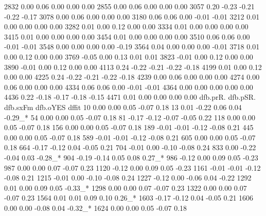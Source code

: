 \begin{Schunk}
\begin{Soutput}
2832  0.00   0.06     0.00     0.00     0.00   
2855  0.00   0.06     0.00     0.00     0.00   
3057  0.20  -0.23    -0.21    -0.22    -0.17   
3078  0.00   0.06     0.00     0.00     0.00   
3180  0.06   0.06     0.00    -0.01    -0.01   
3212  0.01   0.00     0.00     0.00     0.00   
3282  0.01   0.00     0.12     0.00     0.00   
3334  0.01   0.00     0.00     0.00     0.00   
3415  0.01   0.00     0.00     0.00     0.00   
3454  0.01   0.00     0.00     0.00     0.00   
3510  0.06   0.06     0.00    -0.01    -0.01   
3548  0.00   0.00     0.00     0.00    -0.19   
3564  0.04   0.00     0.00     0.00    -0.01   
3718  0.01   0.00     0.12     0.00     0.00   
3769 -0.05   0.00     0.13     0.01     0.01   
3823 -0.01   0.00     0.12     0.00     0.00   
3890 -0.01   0.00     0.12     0.00     0.00   
4113  0.24  -0.22    -0.21    -0.22    -0.18   
4199  0.01   0.00     0.12     0.00     0.00   
4225  0.24  -0.22    -0.21    -0.22    -0.18   
4239  0.00   0.06     0.00     0.00     0.00   
4274  0.00   0.06     0.00     0.00     0.00   
4334  0.06   0.06     0.00    -0.01    -0.01   
4364  0.00   0.00     0.00     0.00     0.00   
4436  0.22  -0.18    -0.17    -0.18    -0.15   
4471  0.01   0.00     0.00     0.00     0.00   
     dfb.prR. dfb.pSR. dfb.sxFm dfb.oYES dffit  
10    0.00     0.00     0.05    -0.07     0.18  
13    0.01    -0.22     0.06     0.04    -0.29_*
54    0.00     0.00     0.05    -0.07     0.18  
81   -0.17    -0.12    -0.07    -0.05     0.22  
118   0.00     0.00     0.05    -0.07     0.18  
156   0.00     0.00     0.05    -0.07     0.18  
189  -0.01    -0.01    -0.12    -0.08     0.21  
445   0.00     0.00     0.05    -0.07     0.18  
589  -0.01    -0.01    -0.12    -0.08     0.21  
605   0.00     0.00     0.05    -0.07     0.18  
664  -0.17    -0.12     0.04    -0.05     0.21  
704  -0.01     0.00    -0.10    -0.08     0.24  
833   0.00    -0.22    -0.04     0.03    -0.28_*
904  -0.19    -0.14     0.05     0.08     0.27_*
986  -0.12     0.00     0.09     0.05    -0.23  
987   0.00     0.00     0.07    -0.07     0.23  
1120 -0.12     0.00     0.09     0.05    -0.23  
1161 -0.01    -0.01    -0.12    -0.08     0.21  
1215 -0.01     0.00    -0.10    -0.08     0.24  
1227 -0.12     0.00    -0.06     0.04    -0.22  
1292  0.01     0.00     0.09     0.05    -0.33_*
1298  0.00     0.00     0.07    -0.07     0.23  
1322  0.00     0.00     0.07    -0.07     0.23  
1564  0.01     0.01     0.09     0.10     0.26_*
1603 -0.17    -0.12     0.04    -0.05     0.21  
1606  0.00     0.00    -0.08     0.04    -0.32_*
1624  0.00     0.00     0.05    -0.07     0.18  

\end{Soutput}
\end{Schunk}
